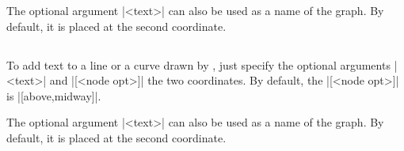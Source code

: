 \begin{tzcode}{.3}
\end{tzcode}

The optional argument |{<text>}|  can also be used as a name of the graph. By default, it is placed at the second coordinate.

\begin{tzcode}{.3}
\end{tzcode}


\subsection{\protect\cmd{\tzto}}
\label{ssi:texttotzto}

To add text to a line or a curve drawn by \icmd{\tzto}, just specify the optional arguments |{<text>}| and |[<node opt>]|  the two coordinates. By default, the |[<node opt>]| is |[above,midway]|.

\begin{tzcode}{.3}
\end{tzcode}

The optional argument |{<text>}|  can also be used as a name of the graph. By default, it is placed at the second coordinate.

\begin{tzcode}{.3}
\end{tzcode}



\subsection{\protect\cmd{\tzbezier}}
\label{ssi:texttotzbezier}

